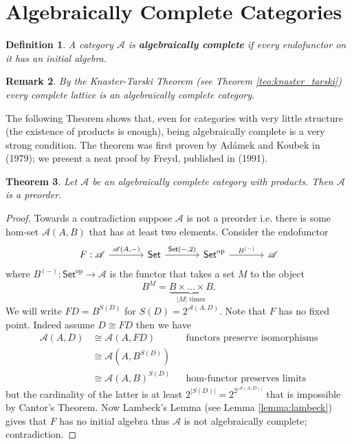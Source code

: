 \documentclass[letterpaper, 11pt, oneside]{memoir}
\theoremstyle{myteo}
\newtheorem{theorem}{Theorem}[section]
\newtheorem{definition}[theorem]{Definition}
\newtheorem{remark}[theorem]{Remark}
\numberwithin{equation}{section}
\newcommand{\marginnote}[1]{\marginpar{\footnotesize #1}}
\newcommand{\Set}{\textsf{Set}}
\newcommand{\op}{\text{op}}
\newcommand{\A}{\mathscr{A}}
\begin{document}
\section{Algebraically Complete Categories}

\begin{definition}
  A category \(\A\) is \textbf{algebraically complete} \marginnote{algebraically complete category} if every endofunctor on it has an initial algebra.
\end{definition}

\begin{remark}
  By the Knaster-Tarski Theorem (see Theorem \ref{teo:knaster_tarski}) every complete lattice is an algebraically complete category.
\end{remark}

The following Theorem shows that, even for categories with very little structure (the existence of products is enough), being algebraically complete is a very strong condition.
The theorem was first proven by Adámek and Koubek in \cite{Adamek-Koubek-1979} (1979); we present a neat proof by Freyd, published in \cite{freyd-1991} (1991).

\begin{theorem}
  Let \(\A\) be an algebraically complete category with products.
  Then \(\A\) is a preorder.
\end{theorem}

\begin{proof}
  Towards a contradiction suppose \(\A\) is not a preorder i.e. there is some hom-set \(\A(A, B)\) that has at least two elements.
  Consider the endofunctor
  \begin{equation*}
    \begin{tikzcd}[sep=large]
      F : \A \ar[r, "{\A(A, -)}"] & \Set \ar[r, "{\Set(-, 2)}"] & \Set^\op \ar[r, "B^{(-)}"] & \A
    \end{tikzcd}
  \end{equation*}
  where \(B^{(-)}: \Set^\op \to \A\) is the functor that takes a set \(M\) to the object
  \begin{equation*}
    B^M = \underbrace{B \times \ldots \times B}_{|M| \text{ times}}.
  \end{equation*}
  We will write \(FD = B^{S(D)}\) for \(S(D) = 2^{\A(A, D)}\).
  Note that \(F\) has no fixed point.
  Indeed assume \(D \cong FD\) then we have
  \begin{align*}
    \A(A, D) & \cong \A(A, FD) && \text{functors preserve isomorphisms}\\
             & \cong \A(A, B^{S(D)}) &&\\
             & \cong \A(A, B)^{S(D)} && \text{hom-functor preserves limits}
  \end{align*}
  but the cardinality of the latter is at least \(2^{|S(D)|} = 2^{2^{|\A(A, D)|}}\) that is impossible by Cantor's Theorem.
  Now Lambeck's Lemma (see Lemma \ref{lemma:lambeck}) gives that \(F\) has no initial algebra thus \(\A\) is not algebraically complete; contradiction.
\end{proof}
\end{document}
